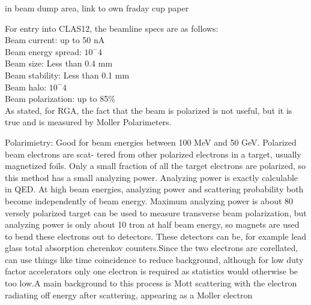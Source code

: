     in beam dump area, link to own fraday cup paper \cite{Johnston2019RealizationElectrons}
    

For entry into CLAS12, the beamline specs are as follows:\\
                    Beam current: up to 50 nA\\
                    Beam energy spread: $10^-4$\\
                    Beam size: Less than 0.4 mm\\
                    Beam stability: Less than 0.1 mm\\
                    Beam halo: $10^-4$\\
                    Beam polarization: up to 85\%\\
                    





 As stated, for RGA, the fact that the beam is polarized is not useful, but it is true and is measured by Moller Polarimeters. 
        
            Polarimietry: 
                    Good for beam energies between 100 MeV and 50 GeV. Polarized beam electrons are scat-
            tered from other polarized electrons in a target, usually magnetized foils. Only a small
            fraction of all the target electrons are polarized, so this method has a small analyzing
            power. Analyzing power is exactly calculable in QED. At high beam energies, analyzing
            power and scattering probability both become independently of beam energy. Maximum
            analyzing power is about 80%
            versely polarized target can be used to measure transverse beam polarization, but analyzing
            power is only about 10%
            tron at half beam energy, so magnets are used to bend these electrons out to detectors.
            These detectors can be, for example lead glass total absorption cherenkov counters.Since
            the two electrons are corellated, can use things like time coincidence to reduce background,
            although for low duty factor accelerators only one electron is required as statistics would
            otherwise be too low.A main background to this process is Mott scattering with the electron
            radiating off energy after scattering, appearing as a Moller electron
            
